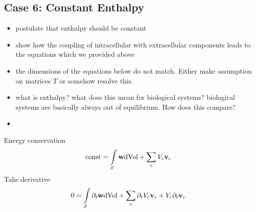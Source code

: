 \subsection{Case 6: Constant Enthalpy}
\begin{itemize}
    \item postulate that enthalpy should be constant
    \item show how the coupling of intracellular with extracellular components leads to the
        equations which we provided above
    \item the dimensions of the equations below do not match. Either make assumption on matrices $T$
        or somehow resolve this.
    \item what is enthalpy? what does this mean for biological systems?
        biological systems are basically always out of equilibrium. How does this compare?
    \item {} \cite{Fang2020}
\end{itemize}

Energy conservation
\begin{equation}
    \text{const} = \int\limits_{\mathscr{E}} \textbf{w} \text{dVol} + \sum\limits_c V_c \textbf{v}_c
\end{equation}
Take derivative
\begin{equation}
    0 = \int\limits_{\mathscr{E}} \partial_t\textbf{w} \text{dVol} + \sum\limits_c \partial_t V_c
    \textbf{v}_c + V_c \partial_t\textbf{v}_c
\end{equation}

%
%


